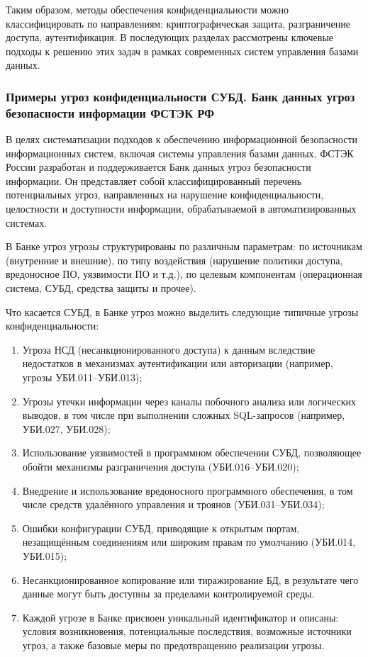 Таким образом, методы обеспечения конфиденциальности можно классифицировать по направлениям: криптографическая защита, разграничение доступа, аутентификация. В последующих разделах рассмотрены ключевые подходы к решению этих задач в рамках современных систем управления базами данных.

\subsubsection{Примеры угроз конфиденциальности СУБД. Банк данных угроз безопасности информации ФСТЭК РФ}

В целях систематизации подходов к обеспечению информационной безопасности информационных систем, включая системы управления базами данных, ФСТЭК России разработан и поддерживается Банк данных угроз безопасности информации. Он представляет собой классифицированный перечень потенциальных угроз, направленных на нарушение конфиденциальности, целостности и доступности информации, обрабатываемой в автоматизированных системах.\cite{bdufstec}

В Банке угроз угрозы структурированы по различным параметрам: по источникам (внутренние и внешние), по типу воздействия (нарушение политики доступа, вредоносное ПО, уязвимости ПО и т.д.), по целевым компонентам (операционная система, СУБД, средства защиты и прочее).

Что касается СУБД, в Банке угроз можно выделить следующие типичные угрозы конфиденциальности:

\begin{enumerate}

    \item Угроза НСД (несанкционированного доступа) к данным вследствие недостатков в механизмах аутентификации или авторизации (например, угрозы УБИ.011–УБИ.013);
    \item Угрозы утечки информации через каналы побочного анализа или логических выводов, в том числе при выполнении сложных SQL-запросов (например, УБИ.027, УБИ.028);
    \item Использование уязвимостей в программном обеспечении СУБД, позволяющее обойти механизмы разграничения доступа (УБИ.016–УБИ.020);
    \item Внедрение и использование вредоносного программного обеспечения, в том числе средств удалённого управления и троянов (УБИ.031–УБИ.034);
    \item Ошибки конфигурации СУБД, приводящие к открытым портам, незащищённым соединениям или широким правам по умолчанию (УБИ.014, УБИ.015);
    \item Несанкционированное копирование или тиражирование БД, в результате чего данные могут быть доступны за пределами контролируемой среды.
    \item Каждой угрозе в Банке присвоен уникальный идентификатор и описаны: условия возникновения, потенциальные последствия, возможные источники угроз, а также базовые меры по предотвращению реализации угрозы.

\end{enumerate}

